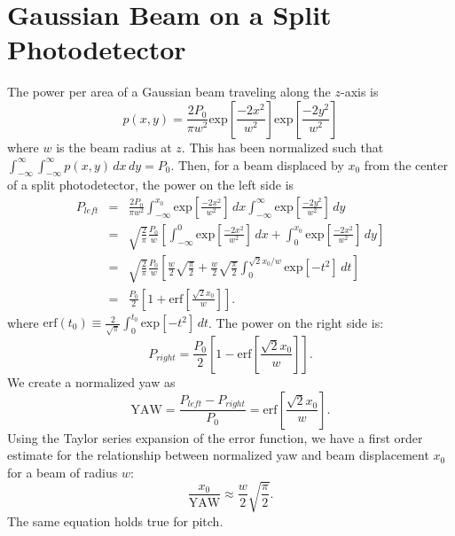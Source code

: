 \section{Gaussian Beam on a Split Photodetector}
\label{app:beamonQPD}
The power per area of a Gaussian beam traveling along the $z$-axis is 
\begin{equation}
p(x,y) = \frac{2 P_0}{\pi w^2} \mbox{exp}\left[\frac{-2x^2}{w^2}\right] \mbox{exp}\left[\frac{-2y^2}{w^2}\right]
\end{equation}
where $w$ is the beam radius at $z$.  This has been normalized such
that $\int_{-\infty}^\infty \int_{-\infty}^\infty p(x,y) \,dx \,dy =
P_0$. Then, for a beam displaced by $x_0$ from the center of a split
photodetector, the power on the left side is
\begin{eqnarray} 
P_{left} &=& \frac{2 P_0}{\pi w^2} \int_{-\infty}^{x_0} \mbox{exp}\left[\frac{-2x^2}{w^2}\right]  \,dx \int_{-\infty}^\infty \mbox{exp}\left[\frac{-2y^2}{w^2}\right] \,dy \\
&=& \sqrt{\frac{2}{\pi}} \frac{P_0}{w} \left[ \int_{-\infty}^{0} \mbox{exp}\left[\frac{-2x^2}{w^2}\right]  \,dx + \int_0^{x_0} \mbox{exp}\left[\frac{-2x^2}{w^2}\right] \,dy \right] \\
&=& \sqrt{\frac{2}{\pi}} \frac{P_0}{w} \left[ \frac{w}{2} \sqrt{\frac{\pi}{2}} + \frac{w}{2} \sqrt{\frac{\pi}{2}} \int_0^{\sqrt{2} x_0 / w} \mbox{exp}\left[-t^2 \right] \,dt  \right] \\
&=& \frac{P_0}{2} \left[1 + \mbox{erf}\left[ \frac{\sqrt{2} x_0}{w} \right] \right].
\end{eqnarray}
where $\mathrm{erf}(t_0) \equiv \frac{2}{\sqrt{\pi}} \int_0^{t_0}
\mbox{exp}\left[-t^2 \right] \,dt$. The power on the right side is:
\begin{equation}
P_{right} = \frac{P_0}{2} \left[1 - \mbox{erf}\left[ \frac{\sqrt{2} x_0}{w} \right] \right].
\end{equation}
We create a normalized yaw as
\begin{equation}
\mathrm{YAW} = \frac{P_{left} - P_{right}}{P_0} = \mathrm{erf}\left[ \frac{\sqrt{2} x_0}{w} \right].
\end{equation}
Using the Taylor series expansion of the error function, we have a
first order estimate for the relationship between normalized yaw and
beam displacement $x_0$ for a beam of radius $w$:
\begin{equation}
\frac{x_0}{\mathrm{YAW}} \approx \frac{w}{2} \sqrt{\frac{\pi}{2}}.
\end{equation}
The same equation holds true for pitch.




